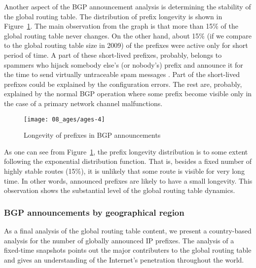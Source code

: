 Another aspect of the BGP announcement analysis is determining the stability
of the global routing table. The distribution of prefix longevity is shown in
Figure~\ref{fig:bgp ages}. The main observation from the graph is that more
than 15\% of the global routing table never changes. On the other hand, about
15\% (if we compare to the global routing table size in 2009) of the prefixes
were active only for short period of time. A part of these short-lived
prefixes, probably, belongs to spammers who hijack somebody else's (or
nobody's) prefix and announce it for the time to send virtually untraceable
spam messages \cite{Ramachandran:2006:Understanding-the-network-level}. Part
of the short-lived prefixes could be explained by the configuration errors.
The rest are, probably, explained by the normal BGP operation where some
prefix become visible only in the case of a primary network channel
malfunctions.

\begin{figure}[htbp]
	\centering
		\texttt{[image: 08\_ages/ages-4]}
	\caption{Longevity of prefixes in BGP announcements}
	\label{fig:bgp ages}
\end{figure}

As one can see from Figure~\ref{fig:bgp ages}, the prefix longevity
distribution is to some extent following the exponential distribution
function. That is, besides a fixed number of highly stable routes (15\%), it
is unlikely that some route is visible for very long time. In other words,
announced prefixes are likely to have a small longevity. This observation
shows the substantial level of the global routing table dynamics.

\subsubsection{BGP announcements by geographical region}

As a final analysis of the global routing table content, we present a
country-based analysis for the number of globally announced IP prefixes. The
analysis of a fixed-time snapshots points out the major contributers to the
global routing table and gives an understanding of the Internet's penetration
throughout the world.

